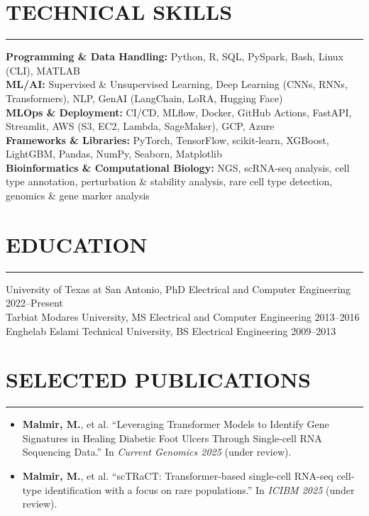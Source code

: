 \documentclass[9pt,letterpaper]{extarticle}
\newcommand{\sectionsep}{%
  \par
  \vspace{-3ex}%
  \noindent\rule{\textwidth}{0.4pt}%
  \vspace{0ex}%
  \par
}
\begin{document}
\section*{TECHNICAL SKILLS}\sectionsep
\textbf{Programming \& Data Handling:} Python, R, SQL, PySpark, Bash, Linux (CLI), MATLAB\\
\textbf{ML/AI:} Supervised \& Unsupervised Learning, Deep Learning (CNNs, RNNs, Transformers), NLP, GenAI (LangChain, LoRA, Hugging Face)\\
\textbf{MLOps \& Deployment:} CI/CD, MLflow, Docker, GitHub Actions, FastAPI, Streamlit, AWS (S3, EC2, Lambda, SageMaker), GCP, Azure\\
\textbf{Frameworks \& Libraries:} PyTorch, TensorFlow, scikit-learn, XGBoost, LightGBM, Pandas, NumPy, Seaborn, Matplotlib\\
\textbf{Bioinformatics \& Computational Biology:} NGS, scRNA-seq analysis, cell type annotation, perturbation \& stability analysis, rare cell type detection, genomics \& gene marker analysis \\

\section*{EDUCATION}
\sectionsep
University of Texas at San Antonio, PhD Electrical and Computer Engineering \hfill 2022--Present\\
Tarbiat Modares University, MS Electrical and Computer Engineering \hfill 2013--2016\\
Enghelab Eslami Technical University, BS Electrical Engineering \hfill 2009--2013

\section*{SELECTED PUBLICATIONS}
\sectionsep
\begin{itemize}
  \item \textbf{Malmir, M.}, et al. ``Leveraging Transformer Models to Identify Gene Signatures in Healing Diabetic Foot Ulcers Through Single-cell RNA Sequencing Data.'' In \emph{Current Genomics 2025} (under review).
  \item \textbf{Malmir, M.}, et al. ``scTRaCT: Transformer-based single-cell RNA-seq cell-type identification with a focus on rare populations.'' In \emph{ICIBM 2025} (under review).
\end{itemize}

\end{document}
